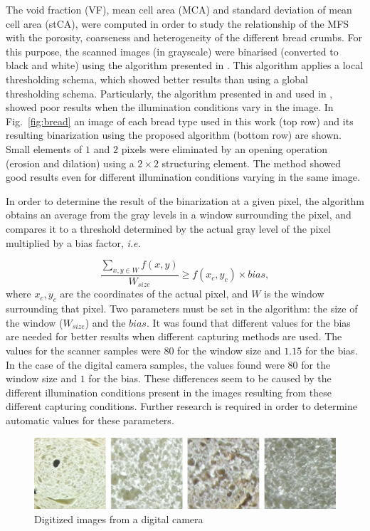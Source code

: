 The void fraction (VF), mean cell area (MCA) and standard deviation of mean cell area (stCA), were computed in order to study the relationship of the MFS with the porosity, coarseness and heterogeneity of the different bread crumbs. For this purpose, the scanned images (in grayscale) were binarised (converted to black and white) using the algorithm presented in \cite{White83}. This algorithm applies a local thresholding schema, which showed better results than using a global thresholding schema. Particularly, the algorithm presented in \cite{Huang95} and used in \cite{Gonzales2008}, showed poor results when the illumination conditions vary in the image. In Fig.~\ref{fig:bread} an image of each bread type used in this work (top row) and its resulting binarization using the proposed algorithm (bottom row) are shown. Small elements of $1$ and $2$ pixels were eliminated by an opening operation (erosion and dilation) using a $2\times2$ structuring element. The method showed good results even for different illumination conditions varying in the same image. 

In order to determine the result of the binarization at a given pixel, the algorithm obtains an average from the gray levels in a window surrounding the pixel, and compares it to a threshold determined by the actual gray level of the pixel multiplied by a bias factor, {\em i.e.}

\begin{equation}
\frac{\sum_{x,y \in W} f(x,y) }{W_{size}} \geq f(x_{c},y_{c}) \times bias,
\label{eqn:white}
\end{equation}
where $x_{c},y_{c}$ are the coordinates of the actual pixel, and $W$ is the window surrounding that pixel. Two parameters must be set in the algorithm: the size of the window ($W_{size}$) and the $bias$. It was found that different values for the bias are needed for better results when different capturing methods are used. The values for the scanner samples were $80$ for the window size and $1.15$ for the bias. In the case of the digital camera samples, the values found were $80$ for the window size and $1$ for the bias. These differences seem to be caused by the different illumination conditions present in the images resulting from these different capturing conditions. Further research is required in order to determine automatic values for these parameters.

\begin{figure}[htb]
\centering
\includegraphics[scale=0.36]{../images/Fig2}
\caption{Digitized images from a digital camera}
\label{fig:camera}
\end{figure}

